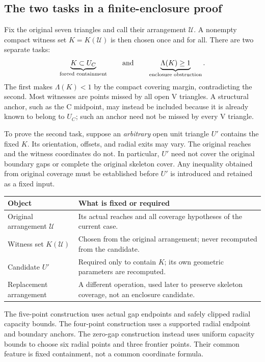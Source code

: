 \subsection{The two tasks in a finite-enclosure proof}
Fix the original seven triangles and call their arrangement $\mathcal U$.
A nonempty compact witness set $K=K(\mathcal U)$ is then chosen once and for all. There are
two separate tasks:
\[
 \underbrace{K\subset U_C}_{\text{forced containment}}
 \qquad\hbox{and}\qquad
 \underbrace{\Lambda(K)\ge1}_{\text{enclosure obstruction}}.
\]
The first makes $\Lambda(K)<1$ by the compact covering margin, contradicting
the second. Most witnesses are points missed by all open V triangles.
A structural anchor, such as the C midpoint, may instead be included because
it is already known to belong to $U_C$; such an anchor need not be missed
by every V triangle.

To prove the second task, suppose an \emph{arbitrary} open unit triangle
$U'$ contains the fixed $K$. Its orientation, offsets, and radial exits may
vary. The original reaches and the witness coordinates do not. In particular,
$U'$ need not cover the original boundary gaps or complete the original
skeleton cover. Any inequality obtained from original coverage must be
established before $U'$ is introduced and retained as a fixed input.

\begin{center}
\small
\renewcommand{\arraystretch}{1.15}
\begin{tabular}{@{}p{.27\linewidth}p{.65\linewidth}@{}}
\toprule
Object & What is fixed or required \\
\midrule
Original arrangement $\mathcal U$ & Its actual reaches and all coverage
hypotheses of the current case. \\
Witness set $K(\mathcal U)$ & Chosen from the original arrangement; never
recomputed from the candidate. \\
Candidate $U'$ & Required only to contain $K$; its own geometric parameters
are recomputed. \\
Replacement arrangement & A different operation, used later to preserve
skeleton coverage, not an enclosure candidate. \\
\bottomrule
\end{tabular}
\end{center}

The five-point construction uses actual gap endpoints and safely clipped
radial capacity bounds. The four-point construction uses a supported radial endpoint
and boundary anchors. The zero-gap construction instead uses uniform
capacity bounds to choose six radial points and three frontier points.
Their common feature is fixed containment, not a common coordinate formula.
